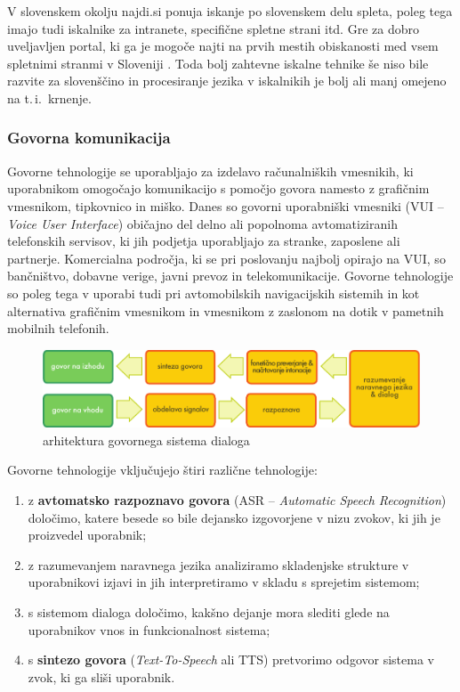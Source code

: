 \begin{multicols}{2}
V slovenskem okolju najdi.si ponuja iskanje po slovenskem delu spleta, poleg tega imajo tudi iskalnike za intranete, specifične spletne strani itd. Gre za dobro uveljav\-ljen portal, ki ga je mogoče najti na prvih mestih obiskanosti med vsem spletnimi stranmi v Sloveniji \cite{moss1}.  Toda bolj zah\-tevne iskalne tehnike še niso bile razvite za slovenščino in procesiranje jezika v iskalnikih je bolj ali manj omejeno na t.\,i.~krnenje.

\subsubsection{Govorna komunikacija}

Go\-vorne tehnologije se uporab\-ljajo za izdelavo računalniških vmesnikih, ki uporabnikom omogočajo komunikacijo s pomočjo go\-vora namesto z grafičnim vmesnikom, tipkovnico in miško. Danes so go\-vorni uporabniški vmesniki (VUI – \textit{Voice User Interface}) običajno del delno ali popolnoma avtomatiziranih telefonskih servisov, ki jih podjetja uporab\-ljajo za stranke, zaposlene ali partnerje. Komercialna področja, ki se pri poslovanju naj\-bolj opirajo na VUI, so bančništvo, dobavne verige, javni prevoz in telekomunikacije. Go\-vorne tehnologije so poleg tega v uporabi tudi pri avtomobilskih navigacij\-skih sistemih in kot alternativa grafičnim vmesnikom in vmesnikom z zaslonom na dotik v pametnih mobilnih telefonih.

\begin{figure}[htb]
  \center 
  \includegraphics[width=\textwidth]{../_media/slovene/simple_speech-based_dialogue_architecture}
  \caption{arhitektura govornega sistema dialoga}
  \label{fig:dialoguearch_de}
\end{figure}

Go\-vorne tehnologije vključujejo štiri različne tehnologije:

\begin{enumerate}
\item z \textbf{avtomatsko razpoznavo govora} (ASR – \textit{Automatic Speech Recognition}) določimo, katere besede so bile dejansko izgo\-vorjene v nizu zvokov, ki jih je proizvedel uporabnik;
\item z razumevanjem naravnega jezika analiziramo skladenjske strukture v uporabnikovi izjavi in jih interpretiramo v skladu s sprejetim sistemom;
\item s sistemom dialoga določimo, kakšno dejanje mora slediti glede na uporabnikov vnos in funkcionalnost sistema;
\item s \textbf{sintezo govora} (\textit{Text-To-Speech} ali TTS) pretvorimo odgo\-vor sistema v zvok, ki ga sliši uporabnik.
\end{enumerate}



\end{multicols}
